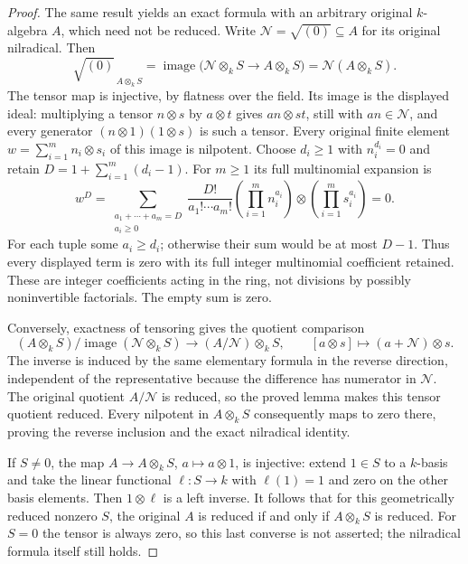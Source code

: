 \begin{proof}
\medskip\noindent
The same result yields an exact formula with
an arbitrary original $k$-algebra $A$, which
need not be reduced. Write
$\mathcal N=\sqrt{(0)}\subseteq A$ for its
original nilradical. Then
$$
\sqrt{(0)}_{\,A\otimes_kS}
=\operatorname{image}\bigl(\mathcal N\otimes_kS
\longrightarrow A\otimes_kS\bigr)
=\mathcal N(A\otimes_kS).
$$
The tensor map is injective, by flatness over
the field. Its image is the displayed ideal:
multiplying a tensor $n\otimes s$ by
$a\otimes t$ gives $an\otimes st$, still
with $an\in\mathcal N$, and every generator
$(n\otimes1)(1\otimes s)$ is such a tensor.
Every original finite element
$w=\sum_{i=1}^m n_i\otimes s_i$ of this image
is nilpotent. Choose $d_i\geq1$ with
$n_i^{d_i}=0$ and retain
$D=1+\sum_{i=1}^m(d_i-1)$.
For $m\geq1$ its full multinomial expansion is
$$
w^D=\sum_{\substack{a_1+\cdots+a_m=D\\a_i\geq0}}
\frac{D!}{a_1!\cdots a_m!}
\left(\prod_{i=1}^m n_i^{a_i}\right)
\otimes\left(\prod_{i=1}^m s_i^{a_i}\right)=0.
$$
For each tuple some $a_i\geq d_i$; otherwise
their sum would be at most $D-1$. Thus every
displayed term is zero with its full integer
multinomial coefficient retained. These are
integer coefficients acting in the ring,
not divisions by possibly noninvertible
factorials. The empty sum is zero.

Conversely, exactness of tensoring gives the
quotient comparison
$$
(A\otimes_kS)/\operatorname{image}(\mathcal N\otimes_kS)
\longrightarrow(A/\mathcal N)\otimes_kS,
\qquad [a\otimes s]\longmapsto(a+\mathcal N)\otimes s.
$$
The inverse is induced by the same elementary
formula in the reverse direction, independent
of the representative because the difference
has numerator in $\mathcal N$. The original
quotient $A/\mathcal N$ is reduced, so the
proved lemma makes this tensor quotient reduced.
Every nilpotent in $A\otimes_kS$ consequently
maps to zero there, proving the reverse
inclusion and the exact nilradical identity.

If $S\ne0$, the map $A\to A\otimes_kS$,
$a\mapsto a\otimes1$, is injective: extend
$1\in S$ to a $k$-basis and take the linear
functional $\ell:S\to k$ with $\ell(1)=1$
and zero on the other basis elements.
Then $1\otimes\ell$ is a left inverse.
It follows that for this geometrically
reduced nonzero $S$, the original $A$ is
reduced if and only if $A\otimes_kS$ is
reduced. For $S=0$ the tensor is always
zero, so this last converse is not asserted;
the nilradical formula itself still holds.
\end{proof}

